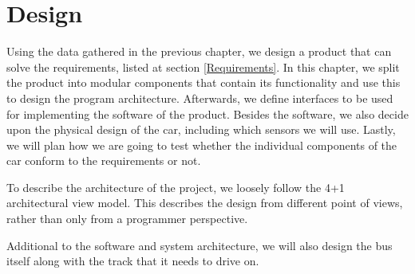 \chapter{Design}

Using the data gathered in the previous chapter, we design a product that can solve the requirements, listed at section \ref{Requirements}. In this chapter, we split the product into modular components that contain its functionality and use this to design the program architecture. Afterwards, we define interfaces to be used for implementing the software of the product. Besides the software, we also decide upon the physical design of the car, including which sensors we will use. Lastly, we will plan how we are going to test whether the individual components of the car conform to the requirements or not.

To describe the architecture of the project, we loosely follow the 4+1 architectural view model. This describes the design from different point of views, rather than only from a programmer perspective. 







Additional to the software and system architecture, we will also design the bus itself along with the track that it needs to drive on. 


